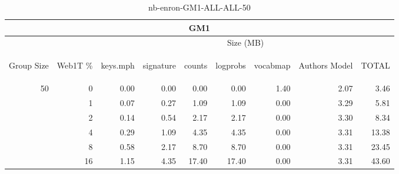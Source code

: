 \begin{center}
\begin{table}[htbp] 
 \begin{center}
\begin{tabular}{ | r | r | r | r | r | r | r | r | r |}
\hline
\multicolumn{9}{|c|}{GM1}\\
\hline
 & & \multicolumn{7}{|c|}{Size (MB)}\\ \cline{3-9}
\begin{sideways}Group Size\end{sideways} & \begin{sideways}Web1T \% \end{sideways} & \begin{sideways}keys.mph\end{sideways} & \begin{sideways}signature\end{sideways} & \begin{sideways}counts\end{sideways} & \begin{sideways}logprobs\end{sideways} & \begin{sideways}vocabmap\end{sideways} & \begin{sideways}Authors Model \end{sideways} & \begin{sideways}TOTAL\end{sideways}\\
\hline
\multirow{5}{*}{50}
 & 0 & 0.00 & 0.00 & 0.00 & 0.00 & 1.40 & 2.07 & 3.46\\ \cline{2-9}
 & 1 & 0.07 & 0.27 & 1.09 & 1.09 & 0.00 & 3.29 & 5.81\\ \cline{2-9}
 & 2 & 0.14 & 0.54 & 2.17 & 2.17 & 0.00 & 3.30 & 8.34\\ \cline{2-9}
 & 4 & 0.29 & 1.09 & 4.35 & 4.35 & 0.00 & 3.31 & 13.38\\ \cline{2-9}
 & 8 & 0.58 & 2.17 & 8.70 & 8.70 & 0.00 & 3.31 & 23.45\\ \cline{2-9}
 & 16 & 1.15 & 4.35 & 17.40 & 17.40 & 0.00 & 3.31 & 43.60\\ \cline{2-9}
\hline
\end{tabular}
\caption{nb-enron-GM1-ALL-ALL-50}
\label{table:nb-enron-GM1-ALL-ALL-50}
\end{center}
 \end{table}
\end{center}

